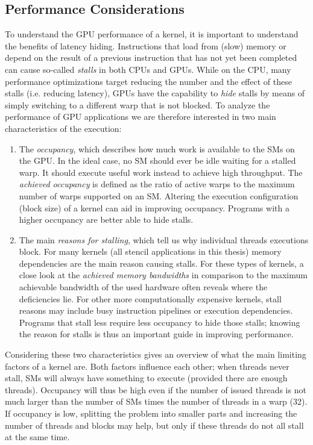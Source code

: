 \subsection{Performance Considerations}
\label{sec:arguing}

To understand the GPU performance of a kernel, it is important to understand the benefits of latency hiding. Instructions that load from (slow) memory or depend on the result of a previous instruction that has not yet been completed can cause so-called \emph{stalls} in both CPUs and GPUs. While on the CPU, many performance optimizations target reducing the number and the effect of these stalls (i.e. reducing latency), GPUs have the capability to \emph{hide} stalls by means of simply switching to a different warp that is not blocked. To analyze the performance of GPU applications we are therefore interested in two main characteristics of the execution:

\begin{enumerate}
    \item The \emph{occupancy}, which describes how much work is available to the SMs on the GPU. In the ideal case, no SM should ever be idle waiting for a stalled warp. It should execute useful work instead to achieve high throughput. The \emph{achieved occupancy} is defined as the ratio of active warps to the maximum number of warps supported on an SM. Altering the execution configuration (block size) of a kernel can aid in improving occupancy. Programs with a higher occupancy are better able to hide stalls.
    \item The main \emph{reasons for stalling}, which tell us why individual threads executions block. For many kernels (all stencil applications in this thesis) memory dependencies are the main reason causing stalls. For these types of kernels, a close look at the \emph{achieved memory bandwidths} in comparison to the maximum achievable bandwidth of the used hardware often reveals where the deficiencies lie. For other more computationally expensive kernels, stall reasons may include busy instruction pipelines or execution dependencies. Programs that stall less require less occupancy to hide those stalls; knowing the reason for stalls is thus an important guide in improving performance.
\end{enumerate}

Considering these two characteristics gives an overview of what the main limiting factors of a kernel are. Both factors influence each other; when threads never stall, SMs will always have something to execute (provided there are enough threads). Occupancy will thus be high even if the number of issued threads is not much larger than the number of SMs times the number of threads in a warp (32). If occupancy is low, splitting the problem into smaller parts and increasing the number of threads and blocks may help, but only if these threads do not all stall at the same time.

